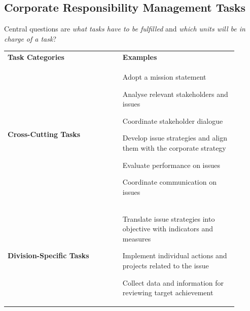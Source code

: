 \documentclass[11pt]{article}
\theoremstyle{definition}
\begin{document}
\subsection{Corporate Responsibility Management Tasks}
Central questions are \textit{what tasks have to be fulfilled} and \textit{which units will be in charge of a task}?
\begin{tabularx}{\linewidth}{p{0.45\linewidth} p{0.45\linewidth}}
	\textbf{Task Categories} & \textbf{Examples}\\[1em]
	\textbf{Cross-Cutting Tasks} & \begin{itemize}
		[
		left=0pt,
		nosep,
		before={\begin{minipage}[t]{\hsize}},
			after={\end{minipage}}
		]
		\item Adopt a mission statement
		\item Analyse relevant stakeholders and issues
		\item Coordinate stakeholder dialogue
		\item Develop issue strategies and align them with the corporate strategy
		\item Evaluate performance on issues
		\item Coordinate communication on issues
	\end{itemize}\\
	\textbf{Division-Specific Tasks} & \begin{itemize}
		[
		left=0pt,
		nosep,
		before={\begin{minipage}[t]{\hsize}},
			after={\end{minipage}}
		]
		\item Translate issue strategies into objective with indicators and measures
		\item Implement individual actions and projects related to the issue
		\item Collect data and information for reviewing target achievement
	\end{itemize}
\end{tabularx}
\end{document}
